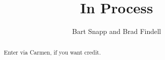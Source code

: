\documentclass[handout,space,nooutcomes]{xourse}
\title{In Process}
\author{Bart Snapp and Brad Findell}
\begin{document}
\begin{abstract}
Enter via Carmen, if you want credit.  
\end{abstract}
\maketitle

{}
\end{document}

